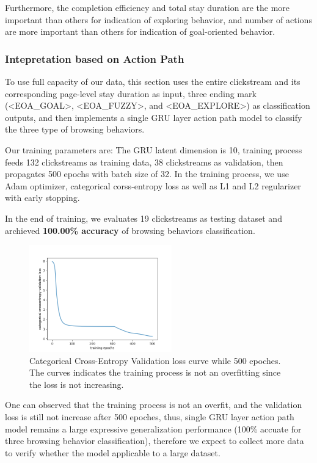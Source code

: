 Furthermore, the completion efficiency and total stay duration are the more important than others for indication of exploring behavior,
and number of actions are more important than others for indication of goal-oriented behavior.

\subsubsection{Intepretation based on Action Path}
\label{sec:inter-action-path}

To use full capacity of our data, this section uses the entire clickstream and its corresponding
page-level stay duration as input, three ending mark (<EOA\_GOAL>, <EOA\_FUZZY>, and <EOA\_EXPLORE>) 
as classification outputs, and then implements a single GRU layer action path model 
to classify the three type of browsing behaviors.

Our training parameters are: 
The GRU latent dimension is 10, training process feeds 132 clickstreams as training data,
38 clickstreams as validation, then 
propagates 500 epochs with batch size of 32. In the training process, we use Adam optimizer,
 categorical corss-entropy loss as well as L1 and L2 regularizer with early stopping.

In the end of training, we evaluates 19 clickstreams as testing dataset and 
archieved \textbf{100.00\% accuracy} of browsing behaviors classification.

\begin{figure}[H]
    \centering
    \includegraphics[width=0.55\textwidth]{figures/class-loss}
    \caption{Categorical Cross-Entropy Validation loss curve while 500 epoches. 
    The curves indicates the training process is not an overfitting since the loss is not increasing.}
    \label{fig:class-loss}
\end{figure}

One can observed that the training process is not an overfit, and the validation loss is 
still not increase after 500 epoches, thus, single GRU layer action path model 
remains a large expressive generalization performance 
(100\% accuate for three browsing behavior classification), therefore
we expect to collect more data to verify whether the model applicable to a large dataset.

